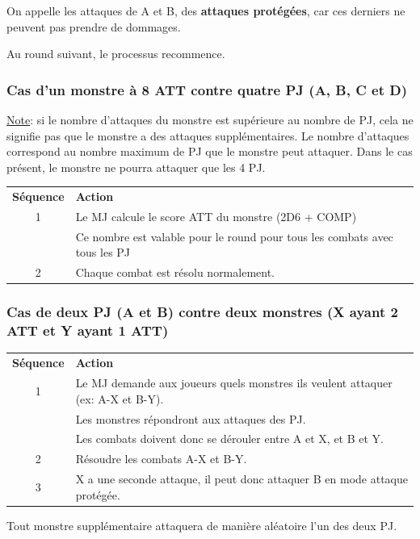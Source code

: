 \documentclass[a4paper, 11pt, twoside]{article}
\begin{document}
On appelle les attaques de A et B, des \textbf{attaques protégées}, car ces derniers ne peuvent pas prendre de dommages.

Au round suivant, le processus recommence.

\subsubsection{Cas d'un monstre à 8 ATT contre quatre PJ (A, B, C et D)}
\label{sec:org661c1b5}

\uline{Note}: si le nombre d'attaques du monstre est supérieure au nombre de PJ, cela ne signifie pas que le monstre a des attaques supplémentaires. Le nombre d'attaques correspond au nombre maximum de PJ que le monstre peut attaquer. Dans le cas présent, le monstre ne pourra attaquer que les 4 PJ.

\begin{longtable}{cl}
\textbf{Séquence} & \textbf{Action}\\
1 & Le MJ calcule le score ATT du monstre (2D6 + COMP)\\
 & Ce nombre  est valable pour le round pour tous les combats avec tous les PJ\\
2 & Chaque combat est résolu normalement.\\
\end{longtable}

\subsubsection{Cas de deux PJ (A et B) contre deux monstres (X ayant 2 ATT et Y ayant 1 ATT)}
\label{sec:org566ae43}

\begin{longtable}{cl}
\textbf{Séquence} & \textbf{Action}\\
1 & Le MJ demande aux joueurs quels monstres ils veulent attaquer (ex: A-X et B-Y).\\
 & Les monstres répondront aux attaques des PJ.\\
 & Les combats doivent donc se dérouler entre A et X, et B et Y.\\
2 & Résoudre les combats A-X et B-Y.\\
3 & X a une seconde attaque, il peut donc attaquer B en mode attaque protégée.\\
\end{longtable}

Tout monstre supplémentaire attaquera de manière aléatoire l'un des deux PJ.
\end{document}
